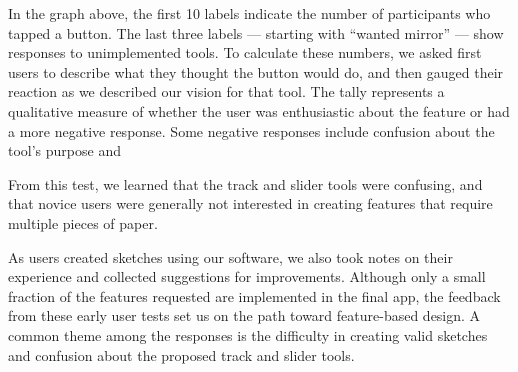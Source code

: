 In the graph above, the first 10 labels indicate the number of
participants who tapped a button. The last three labels --- starting
with ``wanted mirror'' --- show responses to unimplemented tools. To
calculate these numbers, we asked first users to describe what they
thought the button would do, and then gauged their reaction as we
described our vision for that tool. The tally represents a qualitative
measure of whether the user was enthusiastic about the feature or had a
more negative response. Some negative responses include confusion about
the tool's purpose and

From this test, we learned that the track and slider tools were
confusing, and that novice users were generally not interested in
creating features that require multiple pieces of paper.

As users created sketches using our software, we also took notes on
their experience and collected suggestions for improvements. Although
only a small fraction of the features requested are implemented in the
final app, the feedback from these early user tests set us on the path
toward feature-based design. A common theme among the responses is the
difficulty in creating valid sketches and confusion about the proposed
track and slider tools.

